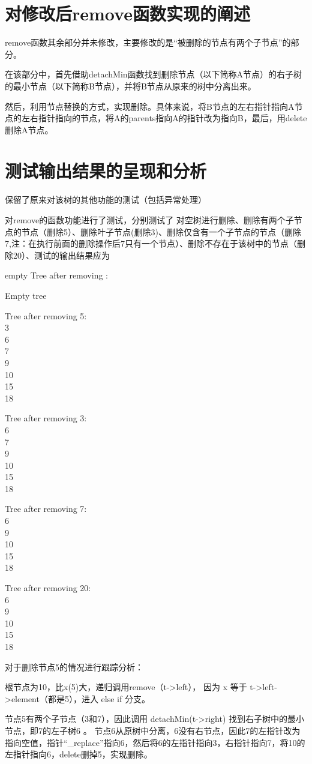 \documentclass[UTF8]{ctexart}
\begin{document}
\pagestyle{fancy}
\fancyhead{}

\section{对修改后remove函数实现的阐述}
remove函数其余部分并未修改，主要修改的是“被删除的节点有两个子节点”的部分。

在该部分中，首先借助detachMin函数找到删除节点（以下简称A节点）的右子树的最小节点（以下简称B节点），并将B节点从原来的树中分离出来。


然后，利用节点替换的方式，实现删除。具体来说，将B节点的左右指针指向A节点的左右指针指向的节点，将A的parents指向A的指针改为指向B，最后，用delete删除A节点。
\\





\section{测试输出结果的呈现和分析}
保留了原来对该树的其他功能的测试（包括异常处理）

对remove的函数功能进行了测试，分别测试了 对空树进行删除、删除有两个子节点的节点（删除5）、删除叶子节点(删除3)、删除仅含有一个子节点的节点（删除7,注：在执行前面的删除操作后7只有一个节点）、删除不存在于该树中的节点（删除20）、测试的输出结果应为

empty Tree after removing :

Empty tree

Tree after removing 5:\\3\\6\\7\\9\\10\\15\\18

Tree after removing 3:\\6\\7\\9\\10\\15\\18

Tree after removing 7:\\6\\9\\10\\15\\18

Tree after removing 20:\\6\\9\\10\\15\\18

对于删除节点5的情况进行跟踪分析：

根节点为10，比x(5)大，递归调用remove（t->left），
因为 x 等于 t->left->element（都是5），进入 else if 分支。

节点5有两个子节点（3和7），因此调用 detachMin(t->right) 找到右子树中的最小节点，即7的左子树6
。
节点6从原树中分离，6没有右节点，因此7的左指针改为指向空值，指针“\_replace”指向6，然后将6的左指针指向3，右指针指向7，将10的左指针指向6，delete删掉5，实现删除。
\end{document}
